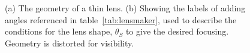 \begin{figure}
\centerline{
}
\centerline{
}
\caption{(a) The geometry of a thin lens. (b) Showing the labels of adding angles referenced in table~\ref{tab:lensmaker}, used to describe the conditions for the lens shape, $\theta_S$ to give the desired focusing. Geometry  is distorted for visibility.}
\label{fig:lens}
\end{figure}


